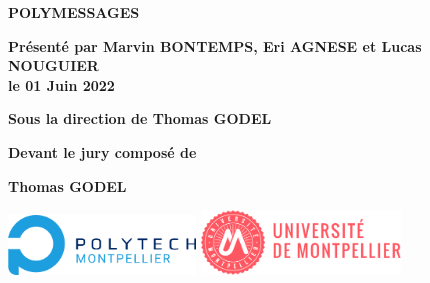 \documentclass[a4paper,12pt]{article}
\begin{document}
\begin{titlepage}
{\bigskip

\color{Titleblue}
\fontsize{17}{20.4}\selectfont
\vspace{2cm}
\textbf{POLYMESSAGES}


\vspace{4cm}
\fontsize{15}{18}\selectfont
\color{black}
\textbf{Présenté par Marvin BONTEMPS, Eri AGNESE et Lucas NOUGUIER\\
le 01 Juin 2022}

\bigskip
\fontsize{13}{15.6}\selectfont
\textbf{Sous la direction de Thomas GODEL}

\vspace{1.5cm}
\normalsize
\textbf{Devant le jury composé de}\\
\bigskip
\fontsize{10}{12}\selectfont
\vspace{1.5mm}
\begin{center}
	\textbf{Thomas GODEL}
\end{center}

\vspace{\fill}
\begin{center}
	\includegraphics[height=60px]{LogoPolytech.png}
	\hfill
	\includegraphics[height=65px]{LogoUM.png}
\end{center}
}
\end{titlepage}


\tableofcontents
\clearpage
\hypersetup{linkcolor=red}
\end{document}
